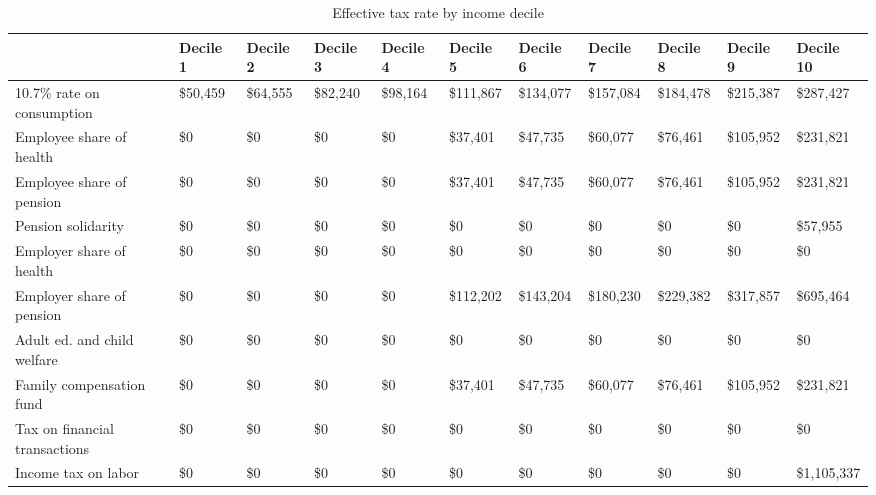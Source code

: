 \documentclass[12pt]{article}
\begin{document}
\begin{landscape}
\begin{table}[]
\caption{Effective tax rate by income decile}
\label{table:tdecile}
\footnotesize
\begin{tabular}{lllllllllll} \hline
& Decile 1                                              & Decile 2  & Decile 3  & Decile 4  & Decile 5    & Decile 6    & Decile 7    & Decile 8    & Decile 9    & Decile 10                \\ \hline
10.7\% rate on consumption              & \$50,459  & \$64,555  & \$82,240  & \$98,164    & \$111,867   & \$134,077   & \$157,084   & \$184,478   & \$215,387   & \$287,427    \\
Employee share of health                              & \$0       & \$0       & \$0       & \$0         & \$37,401    & \$47,735    & \$60,077    & \$76,461    & \$105,952   & \$231,821    \\
Employee share of pension                             & \$0       & \$0       & \$0       & \$0         & \$37,401    & \$47,735    & \$60,077    & \$76,461    & \$105,952   & \$231,821    \\
Pension solidarity                                    & \$0       & \$0       & \$0       & \$0         & \$0         & \$0         & \$0         & \$0         & \$0         & \$57,955     \\
Employer share of health                              & \$0       & \$0       & \$0       & \$0         & \$0         & \$0         & \$0         & \$0         & \$0         & \$0          \\
Employer share of pension                             & \$0       & \$0       & \$0       & \$0         & \$112,202   & \$143,204   & \$180,230   & \$229,382   & \$317,857   & \$695,464    \\
Adult ed. and child welfare                     & \$0       & \$0       & \$0       & \$0         & \$0         & \$0         & \$0         & \$0         & \$0         & \$0          \\
Family compensation fund                              & \$0       & \$0       & \$0       & \$0         & \$37,401    & \$47,735    & \$60,077    & \$76,461    & \$105,952   & \$231,821    \\
Tax on financial transactions                         & \$0       & \$0       & \$0       & \$0         & \$0         & \$0         & \$0         & \$0         & \$0         & \$0          \\
Income tax on labor                                   & \$0       & \$0       & \$0       & \$0         & \$0         & \$0         & \$0         & \$0         & \$0         & \$1,105,337  \\

\end{tabular}
\end{table}
\end{landscape}
\end{document}
